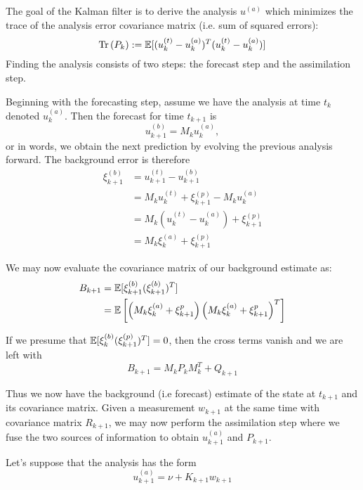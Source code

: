 The goal of the Kalman filter is to derive the analysis $u^{(a)}$ which minimizes the trace of the analysis error covariance matrix (i.e. sum of squared errors): \begin{equation}
    \mathrm{Tr}\left( P_k\right) := \mathbb{E}[(u_k^{(t)}-u_k^{(a)})^T(u_k^{(t)}-u_k^{(a)})]
\end{equation}
Finding the analysis consists of two steps: the forecast step and the assimilation step.

Beginning with the forecasting step, assume we have the analysis at time $t_k$ denoted $u_k^{(a)}$. Then the forecast for time $t_{k+1}$ is
\begin{equation}
    u_{k+1}^{(b)} = M_ku_k^{(a)},
\end{equation}
or in words, we obtain the next prediction by evolving the previous analysis forward. The background error is therefore
\begin{align}
    \xi_{k+1}^{(b)} &= u_{k+1}^{(t)} - u_{k+1}^{(b)} \\
    &= M_ku_k^{(t)}+\xi_{k+1}^{(p)} - M_{k}u_k^{(a)} \\
    &= M_k\left(u_k^{(t)}-u_k^{(a)} \right) + \xi_{k+1}^{(p)} \\
    &= M_k\xi_k^{(a)} + \xi_{k+1}^{(p)}
\end{align}

We may now evaluate the covariance matrix of our background estimate as:
\begin{align}
    B_{k+1} &= \mathbb{E}[\xi_{k+1}^{(b)}(\xi_{k+1}^{(b)})^T] \\
    &= \mathbb{E}\left[\left(M_k\xi_k^{(a)} + \xi_{k+1}^p \right) \left(M_k\xi_k^{(a)} + \xi_{k+1}^p \right)^T \right] \\
\end{align}

If we presume that $\mathbb{E}[\xi_k^{(b)}(\xi_{k+1}^{(p)})^T] = 0$, then the cross terms vanish and we are left with
\begin{equation}
    \boxed{B_{k+1} = M_kP_kM_k^T + Q_{k+1}}
\end{equation}

Thus we now have the background (i.e forecast) estimate of the state at $t_{k+1}$ and its covariance matrix. Given a measurement $w_{k+1}$ at the same time with covariance matrix $R_{k+1}$, we may now perform the assimilation step where we fuse the two sources of information to obtain $u_{k+1}^{(a)}$ and $P_{k+1}$.

Let's suppose that the analysis has the form
\begin{equation}
    u_{k+1}^{(a)} = \nu + K_{k+1}w_{k+1}
\end{equation}

